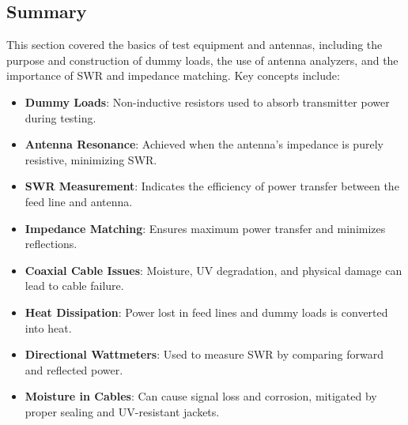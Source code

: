 
\subsection*{Summary}
This section covered the basics of test equipment and antennas, including the purpose and construction of dummy loads, the use of antenna analyzers, and the importance of SWR and impedance matching. Key concepts include:
\begin{itemize}
    \item \textbf{Dummy Loads}: Non-inductive resistors used to absorb transmitter power during testing.
    \item \textbf{Antenna Resonance}: Achieved when the antenna's impedance is purely resistive, minimizing SWR.
    \item \textbf{SWR Measurement}: Indicates the efficiency of power transfer between the feed line and antenna.
    \item \textbf{Impedance Matching}: Ensures maximum power transfer and minimizes reflections.
    \item \textbf{Coaxial Cable Issues}: Moisture, UV degradation, and physical damage can lead to cable failure.
    \item \textbf{Heat Dissipation}: Power lost in feed lines and dummy loads is converted into heat.
    \item \textbf{Directional Wattmeters}: Used to measure SWR by comparing forward and reflected power.
    \item \textbf{Moisture in Cables}: Can cause signal loss and corrosion, mitigated by proper sealing and UV-resistant jackets.
\end{itemize}
